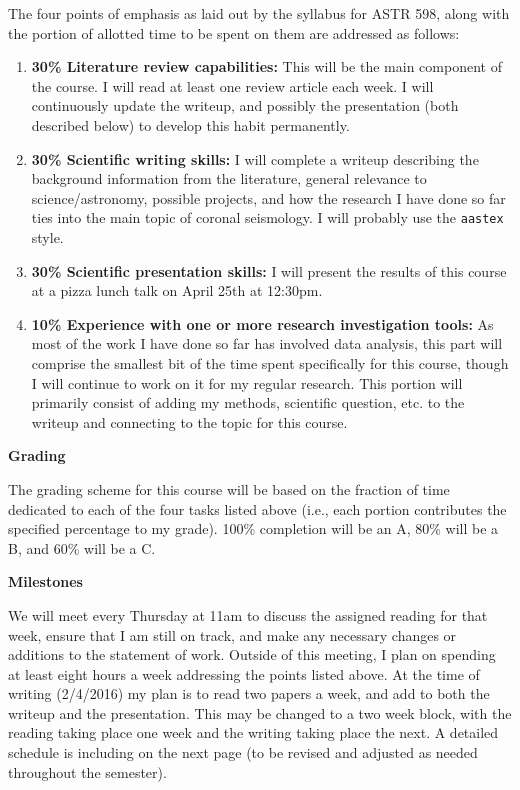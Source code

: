 \documentclass[12pt]{article}
\begin{document}
The four points of emphasis as laid out by the syllabus for ASTR
598, along with the portion of allotted time to be spent on them
are addressed as follows:
\begin{enumerate}
    \item \textbf{30\% Literature review capabilities:} This will be the main
        component of the course. I will read at least one review article
        each week. I will continuously update the writeup, and
        possibly the presentation (both described below)
        to develop this habit permanently.
    \item \textbf{30\% Scientific writing skills:} I will complete a
        writeup describing the
        background information from the literature, general
        relevance to science/astronomy, possible projects, and how the
        research I have done so far ties into the main topic of coronal
        seismology. I will probably use the \texttt{aastex} style.
    \item \textbf{30\% Scientific presentation skills:}
        I will present the results
        of this course at a pizza lunch talk on April 25th at 12:30pm.
    \item \textbf{10\% Experience with one or more research investigation tools:}
        As most of the work I have done so far has involved data analysis, this
        part will comprise the smallest bit of the time spent specifically for
        this course, though I will continue to work on it for my regular
        research. This portion will primarily consist of adding my
        methods, scientific question, etc. to the writeup and
        connecting to the topic for this course.
\end{enumerate}

\large\textbf{Grading}\normalsize

The grading scheme for this course will be based on the fraction of
time dedicated to each of the four tasks listed above (i.e., each
portion contributes the specified percentage to my grade).
100\% completion will be an A, 80\% will be a B, and 60\% will be a C.


\large\textbf{Milestones}\normalsize

We will meet every Thursday at 11am to discuss the assigned reading
for that week, ensure that I am still on track, and make any necessary
changes or additions to the statement of work.
Outside of this meeting, I plan on spending at least eight
hours a week addressing the points listed above.
At the time of writing (2/4/2016) my plan is to read two papers a
week, and add to both the writeup and the presentation. This may be
changed to a two week block, with the reading taking place one week
and the writing taking place the next.
A detailed schedule is including on the next page (to be revised and
adjusted as
needed throughout the semester).
\end{document}
